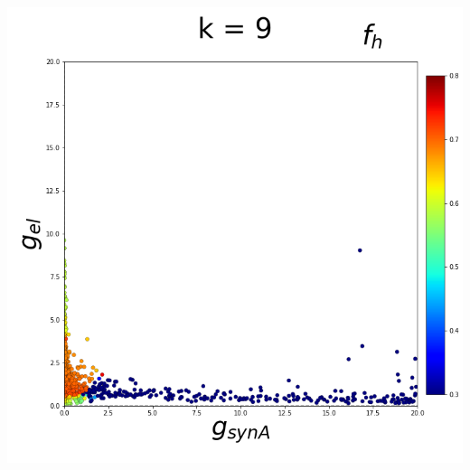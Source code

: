 \documentclass[11pt]{article}
\begin{document}
\begin{center}
\includegraphics[scale=0.125]{DSN_figs/STGCircuit_DSN_c=0_rs=2_k=9.png}
\end{center}
\end{document}
